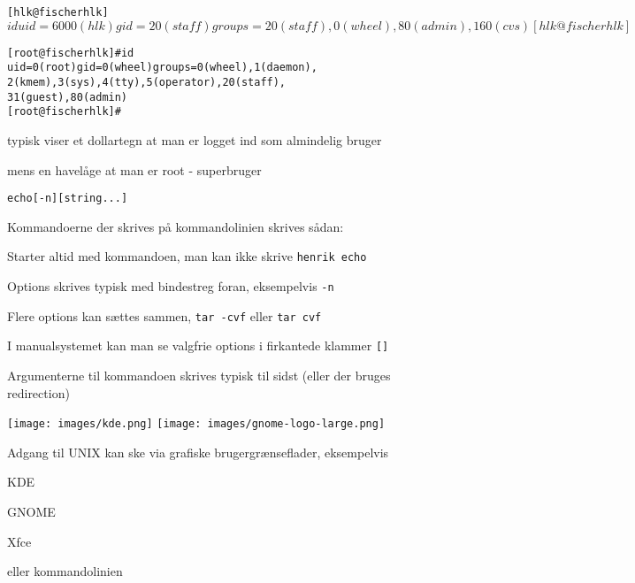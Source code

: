 \documentclass[Screen16to9,17pt]{foils}
\begin{document}


\begin{alltt}
\small
[hlk@fischer hlk]$ id
uid=6000(hlk) gid=20(staff) groups=20(staff),
0(wheel), 80(admin), 160(cvs)
[hlk@fischer hlk]$

[root@fischer hlk]# id
uid=0(root) gid=0(wheel) groups=0(wheel), 1(daemon),
2(kmem), 3(sys), 4(tty), 5(operator), 20(staff),
31(guest), 80(admin)
[root@fischer hlk]#
\end{alltt}

\begin{list1}
\item typisk viser et dollartegn at man er logget ind som almindelig bruger
\item mens en havelåge at man er root - superbruger
\end{list1}



\begin{alltt}
echo [-n] [string ...]
\end{alltt}

\begin{list1}
\item Kommandoerne der skrives på kommandolinien skrives sådan:
\begin{list2}
\item Starter altid med kommandoen, man kan ikke skrive \verb+henrik echo+
\item Options skrives typisk med bindestreg foran, eksempelvis \verb+-n+
\item Flere options kan sættes sammen, \verb+tar -cvf+ eller \verb+tar cvf+
\item I manualsystemet kan man se valgfrie options i firkantede
  klammer \verb+[]+
\item Argumenterne til kommandoen skrives typisk til sidst (eller der
  bruges redirection)
\end{list2}
\end{list1}



\begin{center}
\texttt{[image: images/kde.png]}
\texttt{[image: images/gnome-logo-large.png]}
\end{center}

\begin{list1}
\item Adgang til UNIX kan ske via grafiske brugergrænseflader, eksempelvis
\begin{list2}
\item KDE 
\item GNOME 
\item Xfce 
  \end{list2}
\item eller kommandolinien
\end{list1}


\end{document}
